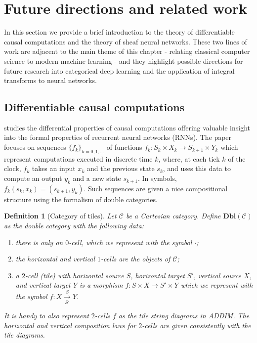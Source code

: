\documentclass[11pt,a4paper,openright,twoside]{report}
\newcounter{mycounter}
\theoremstyle{plain}
\newtheorem{definition}[mycounter]{Definition}
\theoremstyle{definition}
\begin{document}
\section{Future directions and related work}

In this section we provide a brief introduction to the theory of differentiable causal computations and the theory of sheaf neural networks. These two lines of work are adjacent to the main theme of this chapter - relating classical computer science to modern machine learning - and they highlight possible directions for future research into categorical deep learning and the application of integral transforms to neural networks.

\subsection{Differentiable causal computations}

\cite{sprunger2019differentiable} studies the differential properties of causal computations offering valuable insight into the formal properties of recurrent neural networks (RNNs). The paper focuses on sequences $\{f_k\}_{k=0,1,\dots}$ of functions $f_k: S_k \times X_k \to S_{k+1} \times Y_k$ which represent computations executed in discrete time $k$, where, at each tick $k$ of the clock, $f_k$ takes an input $x_k$ and the previous state $s_k$, and uses this data to compute an output $y_k$ and a new state $s_{k+1}$. In symbols, $f_k(s_k,x_k) = (s_{k+1},y_k)$. Such sequences are given a nice compositional structure using the formalism of double categories.

\begin{definition}[Category of tiles]
  Let $\mathcal{C}$ be a Cartesian category. Define $\mathbf{Dbl}(\mathcal{C})$ as the double category with the following data:
  \begin{enumerate}
    \item there is only on $0$-cell, which we represent with the symbol $\cdot$;
    \item the horizontal and vertical $1$-cells are the objects of $\mathcal{C}$;
    \item a $2$-cell (tile) with horizontal source $S$, horizontal target $S'$, vertical source $X$, and vertical target $Y$ is a morphism $f: S \times X \to S' \times Y$ which we represent with the symbol $f:X \overset{S}{\underset{S'}\longrightarrow} Y$.
  \end{enumerate}
  It is handy to also represent $2$-cells $f$ as the tile string diagrams in ADDIM. The horizontal and vertical composition laws for $2$-cells are given consistently with the tile diagrams.
\end{definition}
\end{document}

